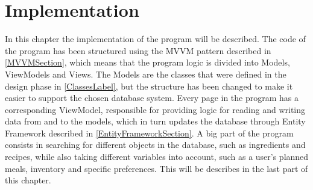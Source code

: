 \chapter{Implementation}
In this chapter the implementation of the program will be described. The code of the program has been structured using the MVVM pattern described in \cref{MVVMSection}, which means that the program logic is divided into Models, ViewModels and Views. The Models are the classes that were defined in the design phase in \cref{ClassesLabel}, but the structure has been changed to make it easier to support the chosen database system.
Every page in the program has a corresponding ViewModel, responsible for providing logic for reading and writing data from and to the models, which in turn updates the database through Entity Framework described in \cref{EntityFrameworkSection}.
A big part of the program consists in searching for different objects in the database, such as ingredients and recipes, while also taking different variables into account, such as a user's planned meals, inventory and specific preferences. This will be describes in the last part of this chapter.